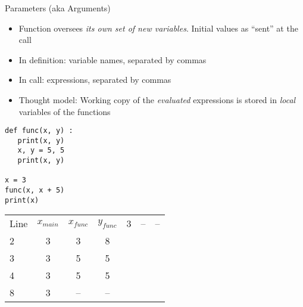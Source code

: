 \begin{frame}[fragile]{Parameters (aka Arguments)}
%
\begin{itemize}
\item Function oversees \emph{its own set of new variables}. Initial values as \enquote{sent} at the call
\item In definition: variable names, separated by commas
\item In call: expressions, separated by commas
\item Thought model: Working copy of the \emph{evaluated} expressions is stored in \emph{local} variables of the functions
\end{itemize}
%
\begin{tcbraster}[raster columns=2,
                  raster equal height,
                  nobeforeafter,
                  raster column skip=0.5cm]
\begin{codebox}
\begin{verbatim}
def func(x, y) :
   print(x, y)
   x, y = 5, 5
   print(x, y)

x = 3
func(x, x + 5)
print(x)   
\end{verbatim}
\end{codebox}
%
\begin{tcolorbox}[title=Evolution of Values]
\scriptsize
\begin{center}
\begin{tabular}{l|ccc}
Line & $x_{main}$ & $x_{func}$ & $y_{func}$  & 3 & -- & -- \\
2 & 3 &  3 &  8 \\
3 & 3 &  5 &  5 \\
4 & 3 &  5 &  5 \\
8 & 3 & -- & --
\end{tabular}
\end{center}
\end{tcolorbox}
\end{tcbraster}
%
\end{frame}


